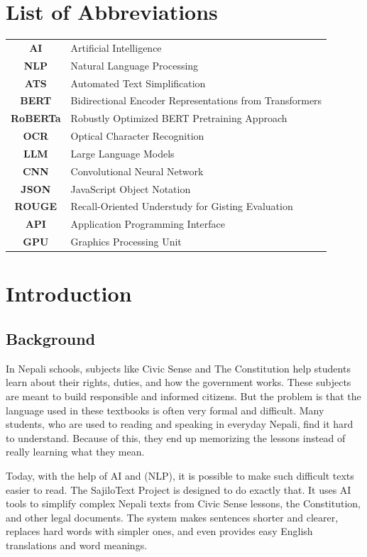 \documentclass[12pt]{report}
\begin{document}
\chapter*{List of Abbreviations}
\begin{tabular}{c l}
\textbf{AI}     &  Artificial Intelligence\\
\textbf{NLP}    &  Natural Language Processing\\
\textbf{ATS}    &   Automated Text Simplification\\
\textbf{BERT}   &  Bidirectional Encoder Representations from Transformers \\
\textbf{RoBERTa}& Robustly Optimized BERT Pretraining Approach\\
\textbf{OCR}    &Optical Character Recognition\\
\textbf{LLM}    &Large Language Models\\
\textbf{CNN}    &Convolutional Neural Network\\
\textbf{JSON}   &  JavaScript Object Notation\\
\textbf{ROUGE}  &  Recall-Oriented Understudy for Gisting Evaluation\\
\textbf{API}    &  Application Programming Interface\\
\textbf{GPU}    &  Graphics Processing Unit\\

\end{tabular}

\chapter{Introduction}
\section{Background}
In Nepali schools, subjects like Civic Sense and The Constitution help students learn about their rights, duties, and how the government works. These subjects are meant to build responsible and informed citizens. But the problem is that the language used in these textbooks is often very formal and difficult. Many students, who are used to reading and speaking in everyday Nepali, find it hard to understand. Because of this, they end up memorizing the lessons instead of really learning what they mean.

Today, with the help of AI and (NLP), it is possible to make such difficult texts easier to read. The SajiloText Project is designed to do exactly that. It uses AI tools to simplify complex Nepali texts from Civic Sense lessons, the Constitution, and other legal documents. The system makes sentences shorter and clearer, replaces hard words with simpler ones, and even provides easy English translations and word meanings.
\end{document}

